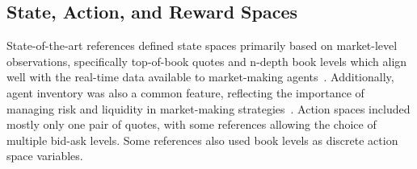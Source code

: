\subsection{State, Action, and Reward Spaces}
\label{subsec:state-action-and-reward-spaces}
State-of-the-art references defined state spaces primarily based on market-level observations,
specifically top-of-book quotes and n-depth book levels which align well with the real-time data available to market-making agents~\cite{He2023, Bakshaev2020}.
Additionally, agent inventory was also a common feature, reflecting the importance of managing risk and liquidity in market-making strategies~\cite{Patel2018, Ganesh2019}.
Action spaces included mostly only one pair of quotes, with some references allowing the choice of multiple bid-ask levels.
Some references also used book levels as discrete action space variables.

